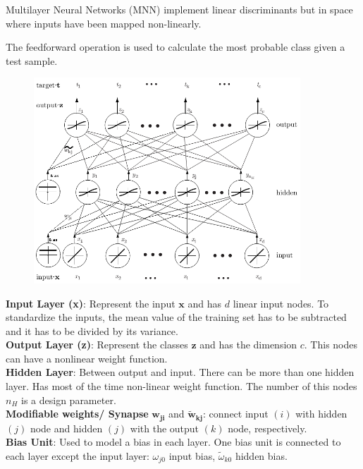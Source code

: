   Multilayer Neural Networks (MNN) implement linear discriminants but in space where inputs have been mapped non-linearly.
 
 The feedforward operation is used to calculate  the most probable class given a test sample.\\
 
    \begin{figure}
        \includegraphics[width=10cm]{./images/feedforwardOperation.png}
    \end{figure}

  \textbf{Input Layer (x)}: Represent the input $\bm{ x}$ and has $d$ linear input nodes. 
  To standardize the inputs, the mean value of the training set has to be subtracted and it has to 
  be divided by its variance.\\
  
  \textbf{Output Layer (z)}: Represent the classes $\bm{ z}$ and has the dimension $c$. This nodes can have a nonlinear weight function.\\
  
  \textbf{Hidden Layer}: Between output and input. There can be more than one hidden layer. 
  Has most of the time non-linear weight function. The number of this nodes $n_H$ is a design parameter.\\
  
  \textbf{Modifiable weights/ Synapse} $\bm{ w_{ji}}$ and  $\bm{\tilde{w}_{kj}}$: 
  connect input $(i)$ with hidden $(j)$ node and hidden $(j)$ with the output $(k)$ node, respectively.  \\
  
  \textbf{Bias Unit}: Used to model a bias in each layer. One bias unit is connected to each layer except the input layer: 
  $\omega_{j0}$ input bias, $\tilde \omega_{k0}$ hidden bias.\\
  
